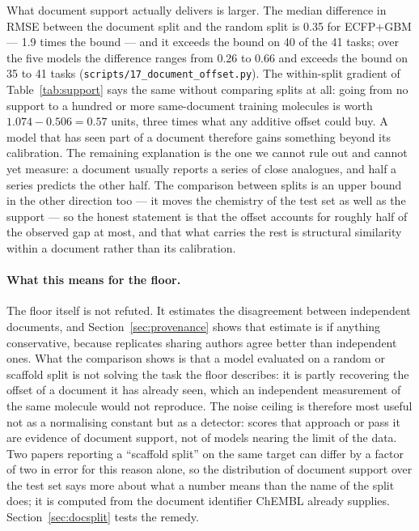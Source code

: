 What document support actually delivers is larger. The median difference in RMSE between the document split and the random split is 0.35 for ECFP+GBM --- 1.9 times the bound --- and it exceeds the bound on 40 of the 41 tasks; over the five models the difference ranges from 0.26 to 0.66 and exceeds the bound on 35 to 41 tasks (\texttt{scripts/}\allowbreak\texttt{17\_document\_offset.py}). The within-split gradient of Table~\ref{tab:support} says the same without comparing splits at all: going from no support to a hundred or more same-document training molecules is worth $1.074-0.506=0.57$ units, three times what any additive offset could buy. A model that has seen part of a document therefore gains something beyond its calibration. The remaining explanation is the one we cannot rule out and cannot yet measure: a document usually reports a series of close analogues, and half a series predicts the other half. The comparison between splits is an upper bound in the other direction too --- it moves the chemistry of the test set as well as the support --- so the honest statement is that the offset accounts for roughly half of the observed gap at most, and that what carries the rest is structural similarity within a document rather than its calibration.

\paragraph{What this means for the floor.} The floor itself is not refuted. It estimates the disagreement between independent documents, and Section~\ref{sec:provenance} shows that estimate is if anything conservative, because replicates sharing authors agree better than independent ones. What the comparison shows is that a model evaluated on a random or scaffold split is not solving the task the floor describes: it is partly recovering the offset of a document it has already seen, which an independent measurement of the same molecule would not reproduce. The noise ceiling is therefore most useful not as a normalising constant but as a detector: scores that approach or pass it are evidence of document support, not of models nearing the limit of the data. Two papers reporting a ``scaffold split'' on the same target can differ by a factor of two in error for this reason alone, so the distribution of document support over the test set says more about what a number means than the name of the split does; it is computed from the document identifier ChEMBL already supplies. Section~\ref{sec:docsplit} tests the remedy.
